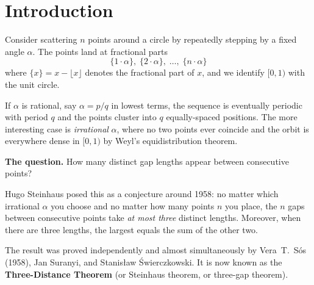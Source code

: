 \section*{Introduction}

Consider scattering $n$ points around a circle by repeatedly stepping by a fixed
angle $\alpha$. The points land at fractional parts
\[
  \{1\cdot\alpha\},\; \{2\cdot\alpha\},\; \ldots,\; \{n\cdot\alpha\}
\]
where $\{x\} = x - \lfloor x \rfloor$ denotes the fractional part of $x$, and we
identify $[0,1)$ with the unit circle.

If $\alpha$ is rational, say $\alpha = p/q$ in lowest terms, the sequence is
eventually periodic with period $q$ and the points cluster into $q$ equally-spaced
positions. The more interesting case is \emph{irrational} $\alpha$, where no two
points ever coincide and the orbit is everywhere dense in $[0,1)$ by Weyl's
equidistribution theorem.

\medskip
\noindent\textbf{The question.} How many distinct gap lengths appear between
consecutive points?

\medskip
Hugo Steinhaus posed this as a conjecture around 1958: no matter which irrational
$\alpha$ you choose and no matter how many points $n$ you place, the $n$ gaps
between consecutive points take \emph{at most three} distinct lengths. Moreover,
when there are three lengths, the largest equals the sum of the other two.

The result was proved independently and almost simultaneously by
Vera~T.\ S\'os (1958), Jan Suranyi, and Stanisław Świerczkowski. It is now
known as the \textbf{Three-Distance Theorem} (or Steinhaus theorem, or
three-gap theorem).
